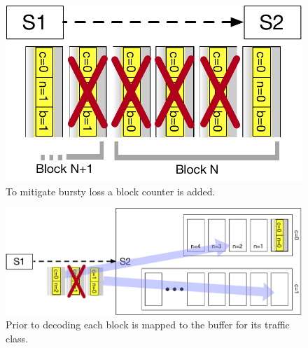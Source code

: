 \begin{figure}
  \centering
  \includegraphics[width=0.4\paperwidth]{loss_example2.pdf}
  \caption{\label{fig:example-loss2}To mitigate bursty loss a block counter is added.}
\end{figure}

\begin{figure}
  \centering
  \includegraphics[width=0.4\paperwidth]{decode_example.pdf}
  \caption{\label{fig:example-decode}Prior to decoding each block is mapped to the buffer for its traffic class.}
\end{figure}

